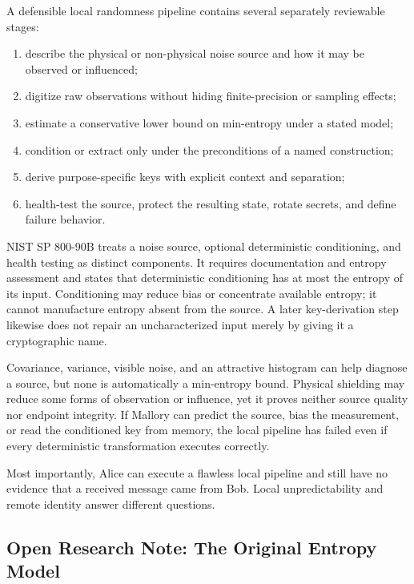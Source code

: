 A defensible local randomness pipeline contains several separately reviewable
stages:

\begin{enumerate}
    \item describe the physical or non-physical noise source and how it may be
    observed or influenced;
    \item digitize raw observations without hiding finite-precision or sampling
    effects;
    \item estimate a conservative lower bound on min-entropy under a stated
    model;
    \item condition or extract only under the preconditions of a named
    construction;
    \item derive purpose-specific keys with explicit context and separation;
    \item health-test the source, protect the resulting state, rotate secrets,
    and define failure behavior.
\end{enumerate}

NIST SP 800-90B treats a noise source, optional deterministic conditioning,
and health testing as distinct components.  It requires documentation and
entropy assessment and states that deterministic conditioning has at most the
entropy of its input\cite{nist80090b}.  Conditioning may reduce bias or
concentrate available entropy; it cannot manufacture entropy absent from the
source.  A later key-derivation step likewise does not repair an
uncharacterized input merely by giving it a cryptographic name.

Covariance, variance, visible noise, and an attractive histogram can help
diagnose a source, but none is automatically a min-entropy bound.  Physical
shielding may reduce some forms of observation or influence, yet it proves
neither source quality nor endpoint integrity.  If Mallory can predict the
source, bias the measurement, or read the conditioned key from memory, the
local pipeline has failed even if every deterministic transformation executes
correctly.

Most importantly, Alice can execute a flawless local pipeline and still have
no evidence that a received message came from Bob.  Local unpredictability and
remote identity answer different questions.

\subsection{Open Research Note: The Original Entropy Model}

